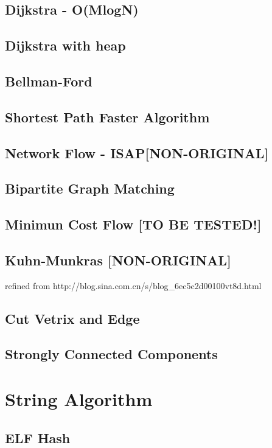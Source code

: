 \documentclass[a4paper]{article}
\begin{document}
\subsection{Dijkstra - O(MlogN)}

\subsection{Dijkstra with heap}

\subsection{Bellman-Ford}

\subsection{Shortest Path Faster Algorithm}

\subsection{Network Flow - ISAP[NON-ORIGINAL]}

\subsection{Bipartite Graph Matching}

\subsection{Minimun Cost Flow [TO BE TESTED!]}

\subsection{Kuhn-Munkras [NON-ORIGINAL]}
refined from http://blog.sina.com.cn/s/blog\_6ec5c2d00100vt8d.html

\subsection{Cut Vetrix and Edge}

\subsection{Strongly Connected Components}

\section{String Algorithm}
\subsection{ELF Hash}

\end{document}
